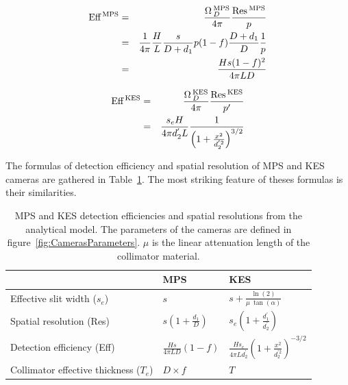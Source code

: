 \documentclass[a4paper,english,12pt]{article}
\begin{document}
\begin{eqnarray}
  \label{eq:de_mps}
  \textrm{Eff}\,_{}^{\textrm{MPS}} & = & \frac{\Omega\,_D^{\textrm{MPS}}}{4\pi} \frac{\textrm{Res}\,_{}^{\textrm{MPS}}}{p} \nonumber\\
                & = & \frac{1}{4\pi} \frac{H}{L} \frac{s}{D+d_1} p(1-f)
                      \frac{D+d_1}{D} \frac{1}{p} \nonumber\\
                & = & \frac{Hs(1-f)^2}{4 \pi L D}
\end{eqnarray}

\begin{eqnarray}
  \label{eq:de_kes}
	\textrm{Eff}\,_{}^{\textrm{KES}} & = & \frac{\Omega\,_D^{\textrm{KES}}}{4\pi} \frac{\textrm{Res}\,_{}^{\textrm{KES}}}{p'} \nonumber\\
	& = & \frac{s_e H}{4\pi d_2^{'} L} \frac{1}{\left( 1+\frac{x^2}{d_2^{'2}}\right)^{3/2}}
\end{eqnarray}



The formulas of detection efficiency and spatial resolution of MPS and KES cameras are gathered in Table~\ref{table:AMformulas}. The most striking feature of theses 
formulas is their similarities. 

\begin{table}[h]
\centering
\begin{tabular}{lll}
	\midrule
	                            & MPS                              & KES \\
	\midrule
	Effective slit width ($s_e$)& $s$                              & $s + \frac{\ln(2)}{\mu~\tan(\alpha)}$ \\
 	Spatial resolution (Res)		& $s \left(1+\frac{d_1}{D}\right)$ & $s_e \left( 1+\frac{d_1^{'}}{d_2^{'}} \right)$ \\
	Detection efficiency (Eff)	& $\frac{H s}{ 4 \pi L D } (1-f) $ & $\frac{H s_e}{ 4 \pi L d_2^{'} } \left( 1 + \frac{x^2}{d_2^{'2}} \right)^{-3/2} $ \\
 	Collimator effective thickness ($T_e$) & $D\times f$           & $T$ \\
	\midrule
\end{tabular}
\caption{MPS and KES detection efficiencies and spatial resolutions from the analytical model. The parameters of the cameras are defined in figure~\ref{fig:CamerasParameters}. $\mu$ is the linear attenuation length of the collimator material.}
\label{table:AMformulas}
\end{table}
\end{document}
